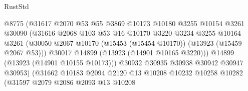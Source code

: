 \begin{lexlean}{RustStd}
\begin{coremodule}
                                      @8775
                                      (@31617
                                        @2070
                                        @53
                                        @55
                                        @3869
                                        @10173
                                        @10180
                                        @3255
                                        @10154
                                        @3261
                                        @30090
                                        (@31616
                                          @2068
                                          @103
                                          @53
                                          @16
                                          @10170
                                          @3220
                                          @3234
                                          @3255
                                          @10164
                                          @3261
                                          (@30050
                                            @2067
                                            @10170
                                            (@15453 (@15454 @10170))
                                            (@13923 (@15459 @2067 @53)))
                                          @30017
                                          @14899
                                          (@13923 (@14901 @10165 @3220)))
                                        @14899
                                        (@13923 (@14901 @10155 @10173)))
                                      @30932
                                      @30935
                                      @30938
                                      @30942
                                      @30947
                                      @30953)
                                    (@31662
                                      @10183
                                      @2094
                                      @2120
                                      @13
                                      @10208
                                      @10232
                                      @10258
                                      @10282
                                      (@31597
                                        @2079
                                        @2086
                                        @2093
                                        @13
                                        @10208

\end{coremodule}
\end{lexlean}
